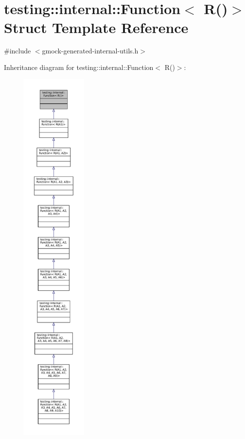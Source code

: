 \hypertarget{structtesting_1_1internal_1_1Function_3_01R_07_08_4}{}\section{testing\+:\+:internal\+:\+:Function$<$ R()$>$ Struct Template Reference}
\label{structtesting_1_1internal_1_1Function_3_01R_07_08_4}


{\ttfamily \#include $<$gmock-\/generated-\/internal-\/utils.\+h$>$}



Inheritance diagram for testing\+:\+:internal\+:\+:Function$<$ R()$>$\+:
\nopagebreak
\begin{figure}[H]
\begin{center}
\leavevmode
\includegraphics[height=550pt]{structtesting_1_1internal_1_1Function_3_01R_07_08_4__inherit__graph}
\end{center}
\end{figure}


